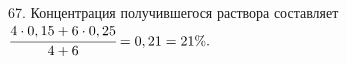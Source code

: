 67. Концентрация получившегося раствора составляет $\cfrac{4\cdot0,15+6\cdot0,25}{4+6}=0,21=21\%.$\\
